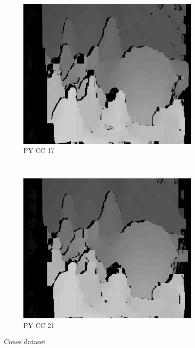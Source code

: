 \begin{figure}
\begin{subfigure}[b]{0.23\textwidth}
    \centering
    \includegraphics[width=\textwidth]{images/stereo-pairs/cones_pyramid_crosschecked_17.png}
    \caption{PY CC 17}
  \end{subfigure}
  ~
  \begin{subfigure}[b]{0.23\textwidth}
    \centering
    \includegraphics[width=\textwidth]{images/stereo-pairs/cones_pyramid_crosschecked_21.png}
    \caption{PY CC 21}
  \end{subfigure}

  \caption{Cones dataset}

\end{figure}

